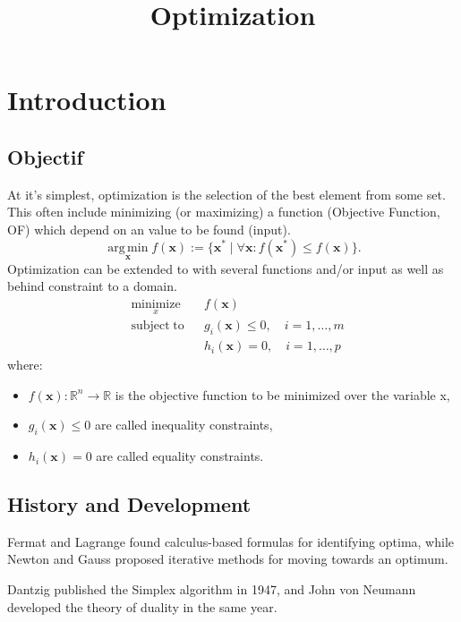 \documentclass[twocolumn]{article}
\title{Optimization}
\date{\vspace{-6ex}}
\numberwithin{equation}{section}
\begin{document}
\maketitle



\section{Introduction}

	\subsection{Objectif}
\begin{framed}
At it's simplest, optimization is the selection of the best element from some set. This often include minimizing (or maximizing) a function (Objective Function, OF) which depend on an value to be found (input). 
$$\operatorname*{arg\,min}_\mathbf{x}  f(\mathbf{x}) := \{\mathbf{x}^* \mid \forall \mathbf{x} : f(\mathbf{x}^*) \le f(\mathbf{x})\}.$$
Optimization can be extended to with several functions and/or input as well as behind constraint to a domain. 
\begin{align*}
&\underset{x}{\operatorname{minimize}}& & f(\mathbf{x}) \\
&\operatorname{subject\;to}
& &g_i(\mathbf{x}) \leq 0, \quad i = 1,\dots,m \\
&&&h_i(\mathbf{x}) = 0, \quad i = 1, \dots,p 
\end{align*}
where:
\begin{itemize}
	\item $f(\mathbf{x}): \mathbb{R}^n \to \mathbb{R}$ is the objective function to be minimized over the variable x,
\item $g_i(\mathbf{x}) \leq 0$ are called inequality constraints,
\item $h_i(\mathbf{x}) = 0$ are called equality constraints.
\end{itemize}
\end{framed}

	\subsection{History and Development}
Fermat and Lagrange found calculus-based formulas for identifying optima, while Newton and Gauss proposed iterative methods for moving towards an optimum.

Dantzig published the Simplex algorithm in 1947, and John von Neumann developed the theory of duality in the same year.
\end{document}
